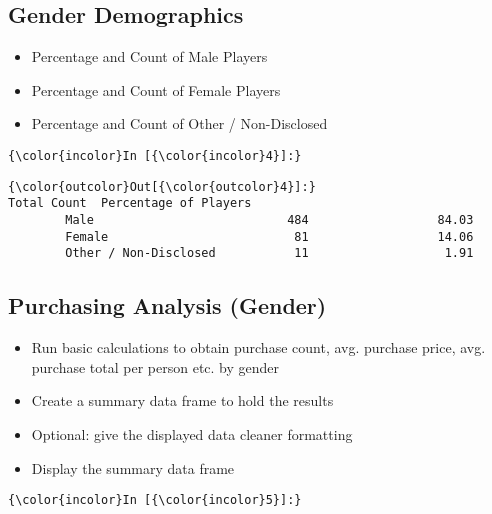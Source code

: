 \documentclass[11pt]{article}
\begin{document}
    \hypertarget{gender-demographics}{%
\subsection{Gender Demographics}\label{gender-demographics}}

    \begin{itemize}
\item
  Percentage and Count of Male Players
\item
  Percentage and Count of Female Players
\item
  Percentage and Count of Other / Non-Disclosed
\end{itemize}

    \begin{Verbatim}[commandchars=\\\{\}]
{\color{incolor}In [{\color{incolor}4}]:} 
\end{Verbatim}


\begin{Verbatim}[commandchars=\\\{\}]
{\color{outcolor}Out[{\color{outcolor}4}]:}                        Total Count  Percentage of Players
        Male                           484                  84.03
        Female                          81                  14.06
        Other / Non-Disclosed           11                   1.91
\end{Verbatim}
            
    \hypertarget{purchasing-analysis-gender}{%
\subsection{Purchasing Analysis
(Gender)}\label{purchasing-analysis-gender}}

    \begin{itemize}
\item
  Run basic calculations to obtain purchase count, avg. purchase price,
  avg. purchase total per person etc. by gender
\item
  Create a summary data frame to hold the results
\item
  Optional: give the displayed data cleaner formatting
\item
  Display the summary data frame
\end{itemize}

    \begin{Verbatim}[commandchars=\\\{\}]
{\color{incolor}In [{\color{incolor}5}]:} 
\end{Verbatim}
\end{document}
